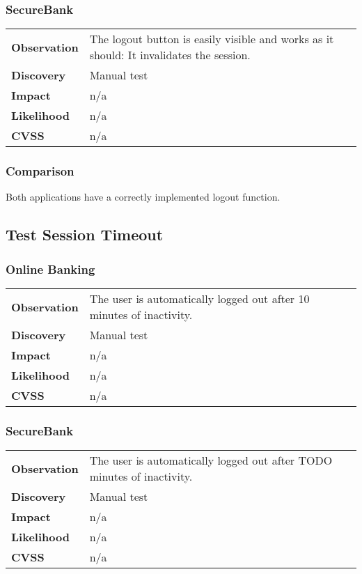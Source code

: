 \subsubsection*{SecureBank}

\begin{tabular}{l|p{10cm}}
\textbf{Observation} & The logout button is easily visible and works as it should: It invalidates the session. \\
\textbf{Discovery} & Manual test \\
\textbf{Impact} & n/a \\
\textbf{Likelihood} & n/a \\
\textbf{CVSS} & n/a \\
\end{tabular}

\subsubsection*{Comparison}
Both applications have a correctly implemented logout function.

\clearpage


\subsection{Test Session Timeout}

\subsubsection*{Online Banking}

\begin{tabular}{l|p{10cm}}
\textbf{Observation} & The user is automatically logged out after 10 minutes of inactivity. \\
\textbf{Discovery} & Manual test \\
\textbf{Impact} & n/a \\
\textbf{Likelihood} & n/a \\
\textbf{CVSS} & n/a \\
\end{tabular}

\subsubsection*{SecureBank}

\begin{tabular}{l|p{10cm}}
\textbf{Observation} & The user is automatically logged out after TODO minutes of inactivity. \\
\textbf{Discovery} & Manual test \\
\textbf{Impact} & n/a \\
\textbf{Likelihood} & n/a \\
\textbf{CVSS} & n/a \\
\end{tabular}

